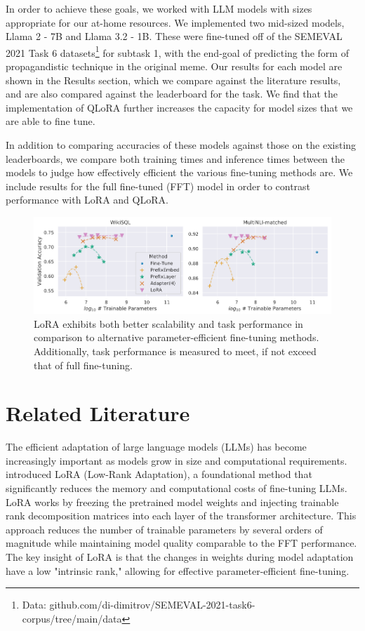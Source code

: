 \documentclass[11pt]{article}
\begin{document}
In order to achieve these goals, we worked with LLM models with sizes appropriate for our at-home resources. We implemented two mid-sized models, Llama 2 - 7B and Llama 3.2 - 1B. These were fine-tuned off of the SEMEVAL 2021 Task 6 datasets\footnote{Data: github.com/di-dimitrov/SEMEVAL-2021-task6-corpus/tree/main/data} for subtask 1, with the end-goal of predicting the form of propagandistic technique in the original meme. Our results for each model are shown in the Results section, which we compare against the literature results, and are also compared against the leaderboard for the task. We find that the implementation of QLoRA further increases the capacity for model sizes that we are able to fine tune.

In addition to comparing accuracies of these models against those on the existing leaderboards, we compare both training times and inference times between the models to judge how effectively efficient the various fine-tuning methods are. We include results for the full fine-tuned (FFT) model in order to contrast performance with LoRA and QLoRA.

\begin{figure}[h]
	\includegraphics[width=6in]{finetuning_scalability.png}
	\centering
	\caption{LoRA exhibits both better scalability and task performance in comparison to alternative parameter-efficient fine-tuning methods. Additionally, task performance is measured to meet, if not exceed that of full fine-tuning. \cite{hu2021lora}}
	\label{fig:ft_scale}
\end{figure}

\section{Related Literature}

The efficient adaptation of large language models (LLMs) has become increasingly important as models grow in size and computational requirements. \cite{hu2021lora} introduced LoRA (Low-Rank Adaptation), a foundational method that significantly reduces the memory and computational costs of fine-tuning LLMs. LoRA works by freezing the pretrained model weights and injecting trainable rank decomposition matrices into each layer of the transformer architecture. This approach reduces the number of trainable parameters by several orders of magnitude while maintaining model quality comparable to the FFT performance. The key insight of LoRA is that the changes in weights during model adaptation have a low "intrinsic rank," allowing for effective parameter-efficient fine-tuning.
\end{document}
